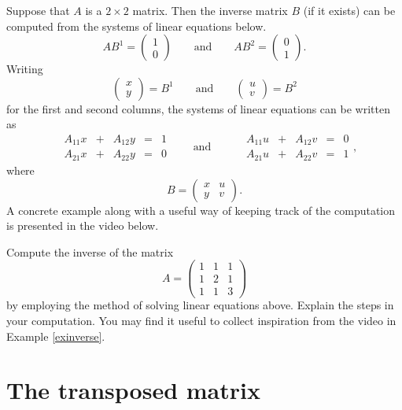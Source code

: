 \documentclass{article}
\begin{document}
\begin{example}\label{exinverse}
  Suppose that $A$ is a $2\times 2$ matrix. Then the inverse matrix
  $B$ (if it exists) can be computed from the systems of linear
  equations below.
  $$
  A B^1 = \begin{pmatrix} 1 \\ 0 \end{pmatrix}\qquad\text{and}\qquad A B^2 = \begin{pmatrix} 0 \\ 1 \end{pmatrix}.
  $$
  Writing
  $$
  \begin{pmatrix} x \\ y \end{pmatrix} = B^1\qquad\text{and}\qquad \begin{pmatrix} u \\ v\end{pmatrix} = B^2
  $$
  for the first and second columns, the systems of linear equations can be written as
$$
\begin{matrix}
  &A_{11} x &+  &A_{12} y &=  &1\\
  &A_{21} x &+  &A_{22} y &=  &0
\end{matrix}\qquad\text{and}\qquad
\begin{matrix}
  &A_{11} u &+  &A_{12} v &=  &0\\
  &A_{21} u &+  &A_{22} v &=  &1
\end{matrix},
$$
where
$$
B =
\begin{pmatrix}
  x & u\\
  y & v
\end{pmatrix}.
$$
A concrete example along with a useful way of keeping track of the computation is presented in the video below.

\begin{video}
\end{video}
\end{example}

\beginshex
Compute the inverse of the matrix
$$
A =
\begin{pmatrix}
  1 & 1 & 1\\
  1 & 2 & 1\\
  1 & 1 & 3
\end{pmatrix}
$$
by employing the method of solving linear equations above. Explain
the steps in your computation. You may find it useful to collect
inspiration from the video in Example \ref{exinverse}.
\endshex

\section{The transposed matrix}
\end{document}
